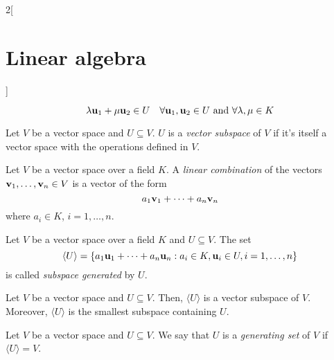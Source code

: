 \documentclass[../../../main_math.tex]{subfiles}
\begin{document}
\begin{multicols}{2}[\section{Linear algebra}]
\begin{definition}
    $$\lambda \boldsymbol{\mathrm{u}}_1+\mu \boldsymbol{\mathrm{u}}_2\in U\quad\forall \boldsymbol{\mathrm{u}}_1,\boldsymbol{\mathrm{u}}_2\in U\text{ and }\forall\lambda,\mu\in K$$
  \end{definition}
  \begin{definition}
    Let $V$ be a vector space and $U\subseteq V$. $U$ is a \emph{vector subspace} of $V$ if it's itself a vector space with the operations defined in $V$.
  \end{definition}
  \begin{definition}
    Let $V$ be a vector space over a field $K$. A \emph{linear combination} of the vectors $\boldsymbol{\mathrm{v}}_1,\ldots,\boldsymbol{\mathrm{v}}_n\in V$ is a vector of the form $$a_1\boldsymbol{\mathrm{v}}_1+\cdots+a_n\boldsymbol{\mathrm{v}}_n$$ where $a_i\in K$, $i=1,\ldots,n$.
  \end{definition}
  \begin{definition}
    Let $V$ be a vector space over a field $K$ and $U\subseteq V$. The set $$\langle U\rangle=\{a_1\boldsymbol{\mathrm{u}}_1+\cdots+a_n\boldsymbol{\mathrm{u}}_n:a_i\in K,\boldsymbol{\mathrm{u}}_i\in U,i=1,\ldots,n\}$$ is called \emph{subspace generated} by $U$.
  \end{definition}
  \begin{lemma}
    Let $V$ be a vector space and $U\subseteq V$. Then, $\langle U\rangle$ is a vector subspace of $V$. Moreover, $\langle U\rangle$ is the smallest subspace containing $U$.
  \end{lemma}
  \begin{definition}
    Let $V$ be a vector space and $U\subseteq V$. We say that $U$ is a \emph{generating set} of $V$ if $\langle U\rangle=V$.
  \end{definition}

\end{multicols}
\end{document}
